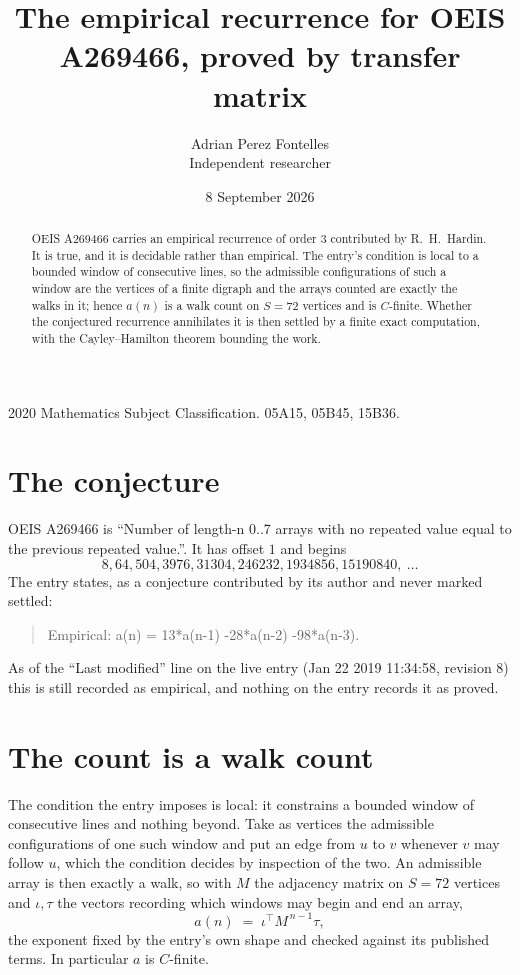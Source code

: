 \documentclass[11pt,a4paper]{article}
\title{The empirical recurrence for OEIS A269466, proved by transfer matrix}
\author{Adrian Perez Fontelles\\ \small Independent researcher}
\date{8 September 2026}
\theoremstyle{plain}
\theoremstyle{definition}
\begin{document}
\maketitle

\begin{abstract}
OEIS A269466 carries an empirical recurrence of order $3$ contributed by R.~H.~Hardin. It is
true, and it is decidable rather than empirical. The entry's condition is local to a bounded window of consecutive lines, so
the admissible configurations of such a window are the vertices of a finite digraph and the
arrays counted are exactly the walks in it; hence $a(n)$ is a walk count on $S=72$ vertices
and is $C$-finite. Whether the conjectured recurrence annihilates it is then settled by a
finite exact computation, with the Cayley--Hamilton theorem bounding the work.
\end{abstract}

\noindent\small 2020 Mathematics Subject Classification. 05A15, 05B45, 15B36.\normalsize

\section{The conjecture}

OEIS A269466 is ``Number of length-n 0..7 arrays with no repeated value equal to the previous repeated value.''. It has offset $1$ and begins
\[
8, 64, 504, 3976, 31304, 246232, 1934856, 15190840,\ \dots
\]
The entry states, as a conjecture contributed by its author and never marked settled:
\begin{quote}
Empirical: a(n) = 13*a(n-1) -28*a(n-2) -98*a(n-3).
\end{quote}
As of the ``Last modified'' line on the live entry (Jan 22 2019 11:34:58, revision 8) this is still
recorded as empirical, and nothing on the entry records it as proved.

\section{The count is a walk count}

The condition the entry imposes is local: it constrains a bounded window of consecutive lines and nothing beyond. Take as
vertices the admissible configurations of one such window and put an edge from $u$ to $v$
whenever $v$ may follow $u$, which the condition decides by inspection of the two. An
admissible array is then exactly a walk, so with $M$ the adjacency matrix on $S=72$ vertices
and $\iota,\tau$ the vectors recording which windows may begin and end an array,
\[
a(n)\;=\;\iota^{\!\top}M^{\,n-1}\tau ,
\]
the exponent fixed by the entry's own shape and checked against its published terms. In
particular $a$ is $C$-finite.
\end{document}
